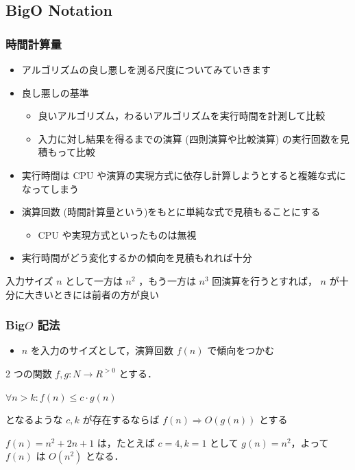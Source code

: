 \subsection{Big\textendash O Notation}
\begin{frame}[shrink]
\frametitle{時間計算量}
  \begin{itemize}
\item アルゴリズムの良し悪しを測る尺度についてみていきます
\item 良し悪しの基準
    \begin{itemize}
\item 良いアルゴリズム，わるいアルゴリズムを実行時間を計測して比較
\item 入力に対し結果を得るまでの演算 (四則演算や比較演算) の実行回数を見積もって比較
    \end{itemize}
\item 実行時間は CPU や演算の実現方式に依存し計算しようとすると複雑な式になってしまう
\item 演算回数 (時間計算量という)をもとに単純な式で見積もることにする
    \begin{itemize}
\item CPU や実現方式といったものは無視
    \end{itemize}
\item 実行時間がどう変化するかの傾向を見積もれれば十分
  \end{itemize}
  \begin{example}
入力サイズ $n$ として一方は \(n^2\) ，もう一方は \(n^3\) 回演算を行うとすれば，
 $n$ が十分に大きいときには前者の方が良い
  \end{example}
\end{frame}
\begin{frame}[shrink]
\frametitle{Big\textendash$O$ 記法}
  \begin{itemize}
\item $n$ を入力のサイズとして，演算回数 \(f(n)\) で傾向をつかむ
  \end{itemize}
  \begin{definition}
2 つの関数 \(f, g\colon N\rightarrow R^{>0}\) とする．
    \begin{center}
\(\forall n>k\colon f(n)\leq c\cdot g(n)\)
    \end{center}
となるような \(c, k\) が存在するならば \(f(n)\Rightarrow O(g(n))\) とする
  \end{definition}
  \begin{example}
\(f(n)=n^2+2n+1\) は，たとえば \(c=4, k=1\) として \(g(n)=n^2\)，よって \(f(n)\) は \(O(n^2)\) となる．
  \end{example}
\end{frame}

